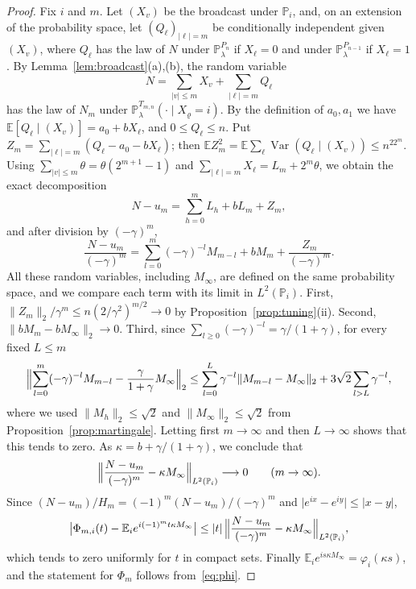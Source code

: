 \documentclass{amsart}
\theoremstyle{definition}
\theoremstyle{remark}
\numberwithin{equation}{section}
\newcommand{\E}{\mathbb{E}}
\newcommand{\Prob}{\mathbb{P}}
\newcommand{\Var}{\operatorname{Var}}
\newcommand{\abs}[1]{\lvert #1\rvert}
\newcommand{\norm}[1]{\lVert #1\rVert}
\begin{document}
\begin{proof}
Fix $i$ and $m$. Let $(X_v)$ be the broadcast under $\Prob_i$, and, on an extension of the probability space, let $(Q_\ell)_{\abs\ell=m}$ be conditionally independent given $(X_v)$, where $Q_\ell$ has the law of $N$ under $\Prob^{P_n}_\lambda$ if $X_\ell=0$ and under $\Prob^{P_{n-1}}_\lambda$ if $X_\ell=1$. By Lemma~\ref{lem:broadcast}(a),(b), the random variable
\[
N=\sum_{\abs v\le m}X_v+\sum_{\abs\ell=m}Q_\ell
\]
has the law of $N_m$ under $\Prob^{T_{m,n}}_\lambda(\cdot\mid X_\varrho=i)$. By the definition of $a_0,a_1$ we have $\E[Q_\ell\mid(X_v)]=a_0+bX_\ell$, and $0\le Q_\ell\le n$. Put $Z_m=\sum_{\abs\ell=m}(Q_\ell-a_0-bX_\ell)$; then $\E Z_m^2=\E\sum_\ell\Var(Q_\ell\mid(X_v))\le n^22^m$. Using $\sum_{\abs v\le m}\theta=\theta(2^{m+1}-1)$ and $\sum_{\abs\ell=m}X_\ell=L_m+2^m\theta$, we obtain the exact decomposition
\[
N-u_m=\sum_{h=0}^mL_h+bL_m+Z_m,
\]
and after division by $(-\gamma)^m$,
\begin{equation}\label{eq:decomp}
\frac{N-u_m}{(-\gamma)^m}=\sum_{l=0}^m(-\gamma)^{-l}M_{m-l}+bM_m+\frac{Z_m}{(-\gamma)^m}.
\end{equation}
All these random variables, including $M_\infty$, are defined on the same probability space, and we compare each term with its limit in $L^2(\Prob_i)$. First, $\norm{Z_m}_2/\gamma^m\le n(2/\gamma^2)^{m/2}\to0$ by Proposition~\ref{prop:tuning}(ii). Second, $\norm{bM_m-bM_\infty}_2\to0$. Third, since $\sum_{l\ge0}(-\gamma)^{-l}=\gamma/(1+\gamma)$, for every fixed $L\le m$
\[
\Bigl\lVert\sum_{l=0}^m(-\gamma)^{-l}M_{m-l}-\frac{\gamma}{1+\gamma}M_\infty\Bigr\rVert_2
\le\sum_{l=0}^{L}\gamma^{-l}\norm{M_{m-l}-M_\infty}_2+3\sqrt2\sum_{l>L}\gamma^{-l},
\]
where we used $\norm{M_h}_2\le\sqrt2$ and $\norm{M_\infty}_2\le\sqrt2$ from Proposition~\ref{prop:martingale}. Letting first $m\to\infty$ and then $L\to\infty$ shows that this tends to zero. As $\kappa=b+\gamma/(1+\gamma)$, we conclude that
\[
\Bigl\lVert\frac{N-u_m}{(-\gamma)^m}-\kappa M_\infty\Bigr\rVert_{L^2(\Prob_i)}\longrightarrow0\qquad(m\to\infty).
\]
Since $(N-u_m)/H_m=(-1)^m(N-u_m)/(-\gamma)^m$ and $\abs{e^{ix}-e^{iy}}\le\abs{x-y}$,
\[
\bigl\lvert\Phi_{m,i}(t)-\E_ie^{i(-1)^mt\kappa M_\infty}\bigr\rvert\le\abs t\,\Bigl\lVert\frac{N-u_m}{(-\gamma)^m}-\kappa M_\infty\Bigr\rVert_{L^2(\Prob_i)},
\]
which tends to zero uniformly for $t$ in compact sets. Finally $\E_ie^{is\kappa M_\infty}=\varphi_i(\kappa s)$, and the statement for $\Phi_m$ follows from~\eqref{eq:phi}.
\end{proof}
\end{document}
